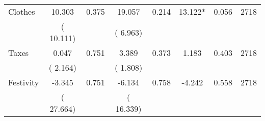 \begin{tabular}{l*{7}{c}}
 Clothes       &             10.303       &        0.375  &             19.057       &        0.214  &             13.122*       &              0.056 &  2718 \\ 
                       &       (      10.111)             &                               &       (       6.963)                     &                               &                                               &                                &                      \\ 

 Taxes       &              0.047       &        0.751  &              3.389       &        0.373  &              1.183       &              0.403 &  2718 \\ 
                       &       (       2.164)             &                               &       (       1.808)                     &                               &                                               &                                &                      \\ 

 Festivity       &             -3.345       &        0.751  &             -6.134       &        0.758  &             -4.242       &              0.558 &  2718 \\ 
                       &       (      27.664)             &                               &       (      16.339)                     &                               &                                               &                                &                      \\ 

\hline \end{tabular}